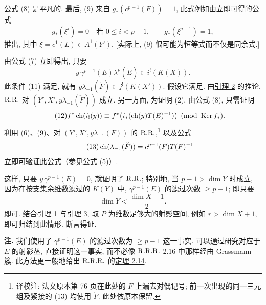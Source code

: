 公式 (8) 是平凡的. 最后, (9) 来自 \(g_*(c^{p-1}(F))=1\), 此式例如由立即可得的公式
\begin{equation}\tag{10 bis}
  g_*(\xi^i)=0\quad\text{若 }0\leq i<p-1,\qquad
  g_*(\xi^{p-1})=1,
\end{equation}
推出, 其中 \(\xi=c^1(L)\in A^1(Y')\). [实际上, (9) 很可能为恒等式而不仅是同余式.]

由公式 (7) 立即得出, 只要
\begin{equation}\tag{11}
  y\,\gamma^{p-1}(E)\lambda^p(\check E)\in i^!(K(X)).
\end{equation}
此条件 (11) 满足, 就有 \(y\lambda_{-1}(\check F)\in j^!(K(X'))\). 假设它满足. 由\hyperlink{sga6.e00.lem.2}{引理 2} 的推论, \(\mathrm{R.R.}\) 对 \((Y',X',y\lambda_{-1}(\check F))\) 成立. 另一方面, 为证明 (2), 由公式 (8), 只需证明
\begin{equation}\tag{12}
  f^*\operatorname{ch}(i_!(y))
  \equiv
  f^*\bigl(i_*(\operatorname{ch}(y)T(E)^{-1})\bigr)
  \pmod{\operatorname{Ker} f_*}.
\end{equation}
利用 (6)、(9)、对 \((Y',X',y\lambda_{-1}(F))\) 的 \(\mathrm{R.R.}\),\footnote{译校注: 法文原本第 76 页在此处的 $F$ 上漏去对偶记号; 前一次出现的同一三元组及紧接的 (13) 均使用 $\check F$. 此处依原本保留.} 以及公式
\begin{equation}\tag{13}
  \operatorname{ch}(\lambda_{-1}(\check F))=c^{p-1}(F)T(F)^{-1}
\end{equation}
立即可验证此公式（参见公式 (5)）.

这样, 只要 \(y\,\gamma^{p-1}(E)=0\), 就证明了 \(\mathrm{R.R.}\); 特别地, 当 \(p-1>\dim Y\) 时成立, 因为在按支集余维数滤过的 \(K(Y)\) 中, \(\gamma^{p-1}(E)\) 的滤过次数 \(\geq p-1\); 即只要
\[
  \dim Y < \frac{\dim X-1}{2}.
\]
即可. 结合\hyperlink{sga6.e00.lem.1}{引理 1} 与\hyperlink{sga6.e00.lem.3}{引理 3}, 取 \(P\) 为维数足够大的射影空间, 例如 \(r>\dim X+1\), 即可归结到此情形. 断言得证.

\textbf{注.} 我们使用了 \(\gamma^{p-1}(E)\) 的滤过次数为 \(\geq p-1\) 这一事实. 可以通过研究对应于 \(E\) 的射影丛, 直接证明这一事实, 而不必像 \(\mathrm{R.R.R.}\) 2.16 中那样经由 Grassmann 簇. 此方法更一般地给出 \(\mathrm{R.R.R.}\) 的\hyperlink{sga6.e00.thm.2-14}{定理 2.14}.

